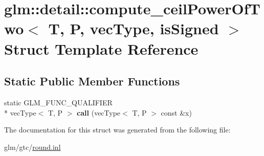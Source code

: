 \hypertarget{structglm_1_1detail_1_1compute__ceilPowerOfTwo}{\section{glm\-:\-:detail\-:\-:compute\-\_\-ceil\-Power\-Of\-Two$<$ T, P, vec\-Type, is\-Signed $>$ Struct Template Reference}
\label{structglm_1_1detail_1_1compute__ceilPowerOfTwo}
}
\subsection*{Static Public Member Functions}
\begin{DoxyCompactItemize}
\item 
\hypertarget{structglm_1_1detail_1_1compute__ceilPowerOfTwo_a81872e12467950a992a4d10c6d73bc45}{static G\-L\-M\-\_\-\-F\-U\-N\-C\-\_\-\-Q\-U\-A\-L\-I\-F\-I\-E\-R \\*
vec\-Type$<$ T, P $>$ {\bfseries call} (vec\-Type$<$ T, P $>$ const \&x)}\label{structglm_1_1detail_1_1compute__ceilPowerOfTwo_a81872e12467950a992a4d10c6d73bc45}

\end{DoxyCompactItemize}


The documentation for this struct was generated from the following file\-:\begin{DoxyCompactItemize}
\item 
glm/gtc/\hyperlink{round_8inl}{round.\-inl}\end{DoxyCompactItemize}
